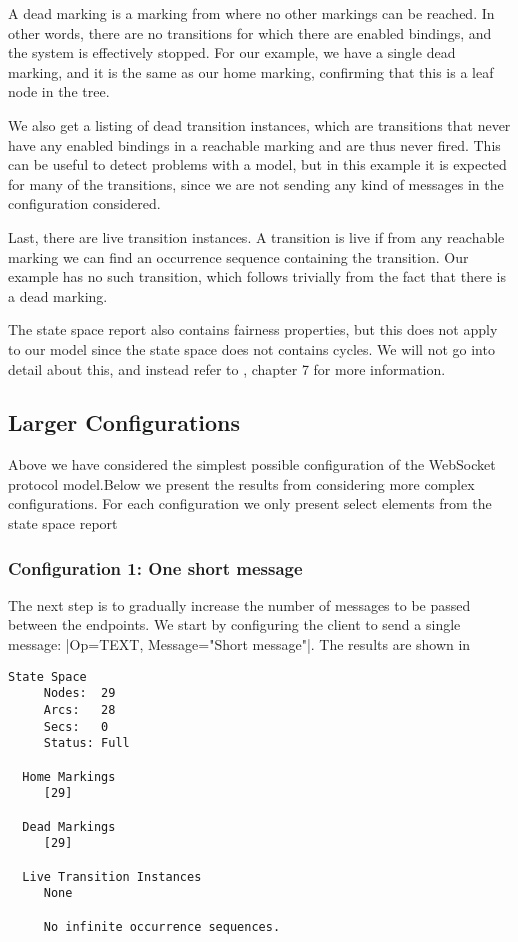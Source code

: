 	A dead marking is a marking from where no other markings can be reached.
	 In other words, there are no transitions
	for which there are enabled bindings, and the system is effectively stopped.
	For our example, we have a single dead marking, and it is the same as our home
	marking, confirming that this is a leaf node in the tree.
	
	We also get a listing of dead transition instances, which are transitions that
	never have any enabled bindings in a reachable marking and are thus never
	fired. This can be useful to detect problems with a model, but in this example
	it is expected for many of the transitions, since we are not sending any kind
	of messages in the configuration considered.
	
	Last, there are live transition instances. A transition is live if from any
	reachable marking we can find an occurrence sequence containing the transition.
	Our example has no such transition, which follows trivially from the fact that
	there is a dead marking.

	The state space report also contains fairness properties, but this does
	not apply to our model since the state space does not contains cycles. We
	will not go into detail about this, and instead refer to \cite{cpn_book},
	chapter 7 for more information.
	
\subsection{Larger Configurations} 
	Above we have considered the simplest possible configuration of the WebSocket
	protocol model.Below we present the results from considering more complex
	configurations. For each configuration we only present select elements from the
	state space report

	\subsubsection{Configuration 1: One short message}
	The next step is to gradually increase the number of messages to be passed
	between the endpoints. We start by configuring the client to send a single
	message: |{Op=TEXT, Message="Short message"}|. The results are shown in
	
	\begin{lstlisting}[language={},float,label=lst:ssa_one_msg,caption=One message]
  State Space
     Nodes:  29
     Arcs:   28
     Secs:   0
     Status: Full

  Home Markings
     [29]

  Dead Markings
     [29]

  Live Transition Instances
     None

     No infinite occurrence sequences.
	\end{lstlisting}
	
